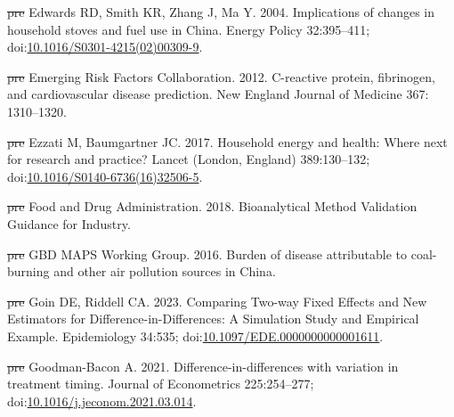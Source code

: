 \documentclass[
  letterpaper,
  DIV=11,
  numbers=noendperiod]{scrartcl}
\newlength{\cslhangindent}
\newenvironment{CSLReferences}[2] %
 {\begin{list}{}{%
  \setlength{\itemindent}{0pt} %
  \setlength{\leftmargin}{0pt} %
  \setlength{\parsep}{0pt} %
  \ifodd #1
   \setlength{\leftmargin}{\cslhangindent} %
   \setlength{\itemindent}{-1\cslhangindent} %
  \fi
  \setlength{\itemsep}{#2\baselineskip}}} %
 {\end{list}} %
\providecommand{\DIFdel}[1]{{\protect\color{red}\sout{#1}}}                      %
\providecommand{\DIFaddbegin}{} %
\providecommand{\DIFaddend}{} %
\providecommand{\DIFdelbegin}{} %
\providecommand{\DIFdelend}{} %
\newcommand{\DIFscaledelfig}{0.5}
\newlength{\DIFdelgraphicswidth} %
\newlength{\DIFdelgraphicsheight} %
\newcommand{\DIFaddincludegraphics}[2][]{{\color{blue}\fbox{\DIFOincludegraphics[#1]{#2}}}} %
\newcommand{\DIFdelincludegraphics}[2][]{%
\sbox{\DIFdelgraphicsbox}{\DIFOincludegraphics[#1]{#2}}%
\settoboxwidth{\DIFdelgraphicswidth}{\DIFdelgraphicsbox} %
\settoboxtotalheight{\DIFdelgraphicsheight}{\DIFdelgraphicsbox} %
\scalebox{\DIFscaledelfig}{%
\parbox[b]{\DIFdelgraphicswidth}{\usebox{\DIFdelgraphicsbox}\\[-\baselineskip] \rule{\DIFdelgraphicswidth}{0em}}\llap{\resizebox{\DIFdelgraphicswidth}{\DIFdelgraphicsheight}{%
\setlength{\unitlength}{\DIFdelgraphicswidth}%
\begin{picture}(1,1)%
\thicklines\linethickness{2pt} %
{\color[rgb]{1,0,0}\put(0,0){\framebox(1,1){}}}%
{\color[rgb]{1,0,0}\put(0,0){\line( 1,1){1}}}%
{\color[rgb]{1,0,0}\put(0,1){\line(1,-1){1}}}%
\end{picture}%
}\hspace*{3pt}}} %
} %
\DeclareRobustCommand{\DIFaddbegin}{\DIFOaddbegin \let\includegraphics\DIFaddincludegraphics} %
\DeclareRobustCommand{\DIFaddend}{\DIFOaddend \let\includegraphics\DIFOincludegraphics} %
\DeclareRobustCommand{\DIFdelbegin}{\DIFOdelbegin \let\includegraphics\DIFdelincludegraphics} %
\DeclareRobustCommand{\DIFdelend}{\DIFOaddend \let\includegraphics\DIFOincludegraphics} %
\begin{document}
\begin{CSLReferences}{1}{1}
\DIFdelbegin %
\DIFdel{pre}%
\DIFdelend \DIFaddbegin {}
\DIFaddend Edwards RD, Smith KR, Zhang J, Ma Y. 2004. Implications of changes in
household stoves and fuel use in {China}. Energy Policy 32:395--411;
doi:\href{https://doi.org/10.1016/S0301-4215(02)00309-9}{10.1016/S0301-4215(02)00309-9}.

\DIFdelbegin %
\DIFdel{pre}%
\DIFdelend \DIFaddbegin {}
\DIFaddend Emerging Risk Factors Collaboration. 2012. C-reactive protein,
fibrinogen, and cardiovascular disease prediction. New England Journal
of Medicine 367: 1310--1320.

\DIFdelbegin %
\DIFdel{pre}%
\DIFdelend \DIFaddbegin {}
\DIFaddend Ezzati M, Baumgartner JC. 2017. Household energy and health: Where next
for research and practice? Lancet (London, England) 389:130--132;
doi:\href{https://doi.org/10.1016/S0140-6736(16)32506-5}{10.1016/S0140-6736(16)32506-5}.

\DIFdelbegin %
\DIFdel{pre}%
\DIFdelend \DIFaddbegin {}
\DIFaddend Food and Drug Administration. 2018. Bioanalytical {Method Validation
Guidance} for {Industry}.

\DIFdelbegin %
\DIFdel{pre}%
\DIFdelend \DIFaddbegin {}
\DIFaddend GBD MAPS Working Group. 2016. Burden of disease attributable to
coal-burning and other air pollution sources in {China}.

\DIFdelbegin %
\DIFdel{pre}%
\DIFdelend \DIFaddbegin {}
\DIFaddend Goin DE, Riddell CA. 2023. Comparing {Two-way Fixed Effects} and {New
Estimators} for {Difference-in-Differences}: {A Simulation Study} and
{Empirical Example}. Epidemiology 34:535;
doi:\href{https://doi.org/10.1097/EDE.0000000000001611}{10.1097/EDE.0000000000001611}.

\DIFdelbegin %
\DIFdel{pre}%
\DIFdelend \DIFaddbegin {}
\DIFaddend Goodman-Bacon A. 2021. Difference-in-differences with variation in
treatment timing. Journal of Econometrics 225:254--277;
doi:\href{https://doi.org/10.1016/j.jeconom.2021.03.014}{10.1016/j.jeconom.2021.03.014}.


\end{CSLReferences}
\end{document}
